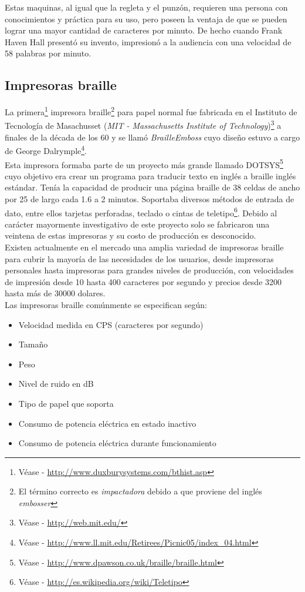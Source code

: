 Estas maquinas, al igual que la regleta y el punz\'on, requieren una persona
con conocimientos y pr\'actica para su uso, pero poseen la ventaja de que se
pueden lograr una mayor cantidad de caracteres por minuto. De hecho cuando
Frank Haven Hall present\'o su invento, impresion\'o a la audiencia con una
velocidad de 58 palabras por minuto.



\subsection{Impresoras braille}
%
La primera\footnote{V\'ease - \url{http://www.duxburysystems.com/bthist.asp}}
impresora braille\footnote{El t\'ermino correcto es \emph{impactadora} debido a
que proviene del ingl\'es \emph{embosser}} para papel normal fue fabricada en
el Instituto de Tecnolog\'ia de Masachusset (\emph{MIT - Massachusetts
Institute
of Technology})\footnote{V\'ease - \url{http://web.mit.edu/}} a finales de la
d\'ecada de los 60 y se llam\'o \emph{BrailleEmboss} cuyo dise\~no estuvo a
cargo
de George Dalrymple\footnote{V\'ease - \url{
http://www.ll.mit.edu/Retirees/Picnic05/index_04.html}}.\\

Esta impresora formaba parte de un proyecto m\'as grande llamado
DOTSYS\footnote{V\'ease - \url{http://www.dpawson.co.uk/braille/braille.html}}
cuyo objetivo era crear un programa para traducir texto en ingl\'es a braille
ingl\'es est\'andar. 
Ten\'ia la capacidad de producir una p\'agina braille de 38
celdas de ancho por 25 de largo cada 1.6 a 2 minutos.
Soportaba diversos m\'etodos de entrada de dato, entre ellos tarjetas
perforadas, teclado o cintas de teletipo\footnote{V\'ease -
\url{http://es.wikipedia.org/wiki/Teletipo}}. Debido al car\'acter mayormente
investigativo de este proyecto solo se fabricaron una veintena de estas
impresoras y su costo de producci\'on es desconocido.\\

Existen actualmente en el mercado una amplia variedad de impresoras braille
para cubrir la mayor\'ia de las necesidades de los usuarios, desde impresoras
personales hasta impresoras para grandes niveles de producci\'on, con
velocidades de impresi\'on desde 10 hasta 400 caracteres por segundo y
precios desde 3200 hasta m\'as de 30000 dolares.\\

Las impresoras braille com\'unmente se especifican seg\'un:

\begin{itemize}
 \item Velocidad medida en CPS (caracteres por segundo)
 \item Tama\~no
 \item Peso
 \item Nivel de ruido en dB
 \item Tipo de papel que soporta
 \item Consumo de potencia el\'ectrica en estado inactivo
 \item Consumo de potencia el\'ectrica durante funcionamiento
\end{itemize}


